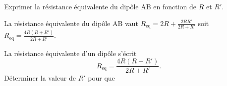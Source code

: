 \medskip

\debutEntrainement

\begin{enonce}
Exprimer la résistance équivalente du dipôle AB en fonction de $R$ et $R'$.
\end{enonce}


\begin{corrige}
	La résistance équivalente du dipôle AB vaut $R_\text{eq}=2R+\frac{2RR'}{2R+R'}$ soit $R_\text{eq}=\frac{4R(R+R')}{2R+R'}$.
\end{corrige}

\finEntrainement




\hauteurLargeurCadreReponse		{7mm}{15mm}
\typeEntrainement				{} %
\initialisationEntrainement

La résistance équivalente d'un dipôle s'écrit 
\[
R_\text{eq}=\frac{4R(R+R')}{2R+R'}.
\]
Déterminer la valeur de $R'$ pour que %
\debutEntrainement

